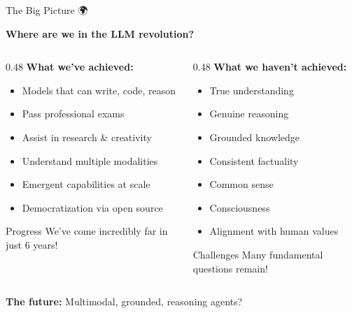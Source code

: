 \documentclass[aspectratio=169]{beamer}
\begin{document}
\begin{frame}{The Big Picture 🌍}
\begin{center}
\Large
\textbf{Where are we in the LLM revolution?}
\end{center}

\vspace{1em}

\begin{columns}[T]
\begin{column}{0.48\textwidth}
\textbf{What we've achieved:}
\begin{itemize}
    \item Models that can write, code, reason
    \item Pass professional exams
    \item Assist in research \& creativity
    \item Understand multiple modalities
    \item Emergent capabilities at scale
    \item Democratization via open source
\end{itemize}

\vspace{0.5em}

\begin{exampleblock}{Progress}
We've come incredibly far in just 6 years!
\end{exampleblock}
\end{column}

\begin{column}{0.48\textwidth}
\textbf{What we haven't achieved:}
\begin{itemize}
    \item True understanding
    \item Genuine reasoning
    \item Grounded knowledge
    \item Consistent factuality
    \item Common sense
    \item Consciousness
    \item Alignment with human values
\end{itemize}

\vspace{0.5em}

\begin{alertblock}{Challenges}
Many fundamental questions remain!
\end{alertblock}
\end{column}
\end{columns}

\vspace{1em}

\begin{center}
\textbf{The future:} Multimodal, grounded, reasoning agents?
\end{center}
\end{frame}
\end{document}
